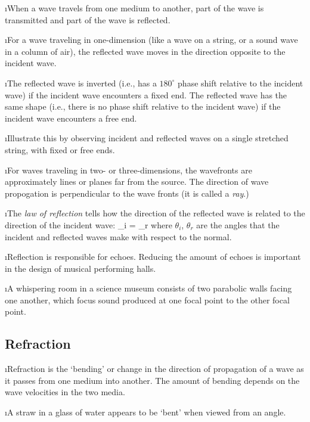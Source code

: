 \i When a wave travels from one medium to another, 
part of the wave is transmitted and part of the wave 
is reflected.

\i For a wave traveling in one-dimension (like a 
wave on a string, or a sound wave in a column of air),
the reflected wave moves in the direction opposite
to the incident wave.

\i The reflected wave is inverted 
(i.e., has a $180^\circ$ phase shift relative to
the incident wave) if the incident wave encounters 
a fixed end.
The reflected wave has the same shape
(i.e., there is no phase shift relative to the 
incident wave) if the incident
wave  encounters a free end.

\i \demo Illustrate this by observing
incident and reflected waves on a single
stretched string, with fixed or free ends.

\i For waves traveling in two- or three-dimensions,
the wavefronts are approximately lines or planes
far from the source.
The direction of wave propogation is perpendicular to
the wave fronts (it is called a {\em ray}.)

\i The {\em law of reflection} tells how the direction 
of the reflected wave is related to the direction of the 
incident wave:
%
\be
\theta_i = \theta_r
\ee
%
where $\theta_i$, $\theta_r$ are the angles that the 
incident and reflected waves make with respect to 
the normal.

\i Reflection is responsible for echoes.
Reducing the amount of echoes is important
in the design of musical performing halls.

\i \ex A whispering room in a science museum consists 
of two parabolic walls facing one another, which focus 
sound produced at one focal point to the other focal point.

\ei

\subsection{Refraction}
\bi

\i Refraction is the `bending' or change in the 
direction of propagation of a wave as it passes from
one medium into another.
The amount of bending depends on the wave velocities 
in the two media.

\i \demo A straw in a glass of water appears to be
`bent' when viewed from an angle.

